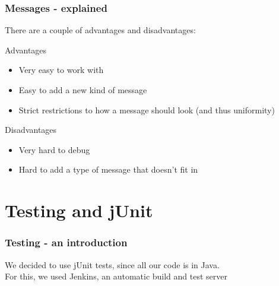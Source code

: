 \documentclass{beamer}
\begin{document}
\begin{frame}
\frametitle{Messages - explained}
There are a couple of advantages and disadvantages:
\begin{block}{Advantages}
\begin{itemize}
\item Very easy to work with
\item Easy to add a new kind of message
\item Strict restrictions to how a message should look (and thus uniformity)
\end{itemize}
\end{block}

\begin{block}{Disadvantages}
\begin{itemize}
\item Very hard to debug
\item Hard to add a type of message that doesn't fit in
\end{itemize}
\end{block}
\end{frame}

\section{Testing and jUnit}
\begin{frame}
\frametitle{Testing - an introduction}
We decided to use jUnit tests, since all our code is in Java.\\
For this, we used Jenkins, an automatic build and test server\\
\end{frame}


{
      \begin{frame}
      \end{frame}
}
\end{document}
